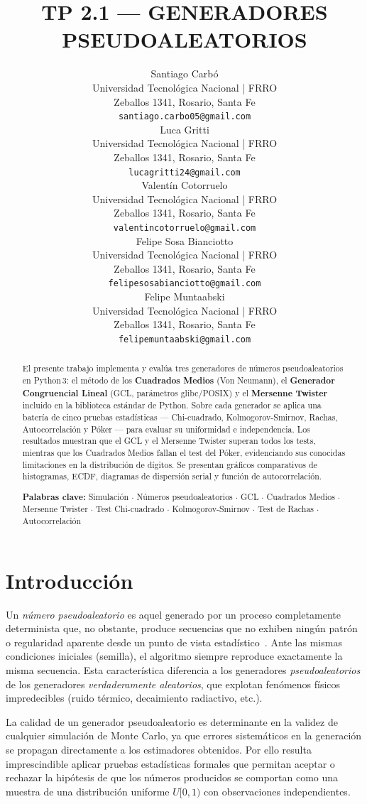 \documentclass{article}
\title{TP 2.1 --- GENERADORES PSEUDOALEATORIOS}
\author{
  Santiago Carbó \\
  Universidad Tecnológica Nacional | FRRO\\
  Zeballos 1341, Rosario, Santa Fe  \\
  \texttt{santiago.carbo05@gmail.com} \\
  \And
  Luca Gritti \\
  Universidad Tecnológica Nacional | FRRO\\
  Zeballos 1341, Rosario, Santa Fe \\
  \texttt{lucagritti24@gmail.com} \\
  \And
  Valentín Cotorruelo \\
  Universidad Tecnológica Nacional | FRRO\\
  Zeballos 1341, Rosario, Santa Fe  \\
  \texttt{valentincotorruelo@gmail.com} \\
  \And
  Felipe Sosa Bianciotto \\
  Universidad Tecnológica Nacional | FRRO\\
  Zeballos 1341, Rosario, Santa Fe  \\
  \texttt{felipesosabianciotto@gmail.com} \\
  \And
  Felipe Muntaabski \\
  Universidad Tecnológica Nacional | FRRO\\
  Zeballos 1341, Rosario, Santa Fe  \\
  \texttt{felipemuntaabski@gmail.com} \\
}
\begin{document}
\maketitle

\begin{abstract}
El presente trabajo implementa y evalúa tres generadores de números
pseudoaleatorios en Python\,3: el método de los \textbf{Cuadrados Medios}
(Von Neumann), el \textbf{Generador Congruencial Lineal} (GCL, parámetros
glibc/POSIX) y el \textbf{Mersenne Twister} incluido en la biblioteca
estándar de Python.  Sobre cada generador se aplica una batería de cinco
pruebas estadísticas — Chi-cuadrado, Kolmogorov-Smirnov, Rachas,
Autocorrelación y Póker — para evaluar su uniformidad e independencia.
Los resultados muestran que el GCL y el Mersenne Twister superan todos los
tests, mientras que los Cuadrados Medios fallan el test del Póker,
evidenciando sus conocidas limitaciones en la distribución de dígitos.
Se presentan gráficos comparativos de histogramas, ECDF, diagramas de
dispersión serial y función de autocorrelación.

\medskip
\noindent\textbf{Palabras clave:}
Simulación $\cdot$ Números pseudoaleatorios $\cdot$ GCL $\cdot$
Cuadrados Medios $\cdot$ Mersenne Twister $\cdot$ Test Chi-cuadrado $\cdot$
Kolmogorov-Smirnov $\cdot$ Test de Rachas $\cdot$ Autocorrelación
\end{abstract}

\section{Introducción}

Un \emph{número pseudoaleatorio} es aquel generado por un proceso
completamente determinista que, no obstante, produce secuencias que no
exhiben ningún patrón o regularidad aparente desde un punto de vista
estadístico~\cite{knuth1997}.  Ante las mismas condiciones iniciales
(semilla), el algoritmo siempre reproduce exactamente la misma secuencia.
Esta característica diferencia a los generadores \emph{pseudoaleatorios}
de los generadores \emph{verdaderamente aleatorios}, que explotan fenómenos
físicos impredecibles (ruido térmico, decaimiento radiactivo, etc.).

La calidad de un generador pseudoaleatorio es determinante en la validez de
cualquier simulación de Monte Carlo, ya que errores sistemáticos en la
generación se propagan directamente a los estimadores obtenidos.  Por ello
resulta imprescindible aplicar pruebas estadísticas formales que permitan
aceptar o rechazar la hipótesis de que los números producidos se comportan
como una muestra de una distribución uniforme $U[0,1)$ con observaciones
independientes.
\end{document}
